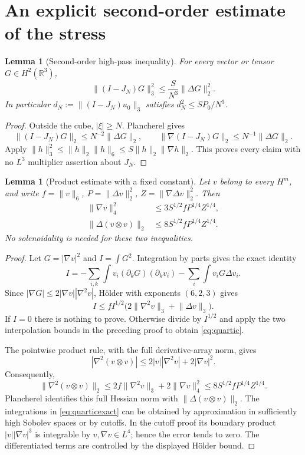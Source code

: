 \documentclass[11pt,a4paper]{article}
\newtheorem{lemma}[theorem]{Lemma}
\theoremstyle{definition}\newtheorem{definition}[theorem]{Definition}
\theoremstyle{remark}\newtheorem{remark}[theorem]{Remark}
\newcommand{\R}{\mathbb R}
\newcommand{\norm}[1]{\lVert #1\rVert}
\numberwithin{equation}{section}
\begin{document}
\section{An explicit second-order estimate of the stress}
\label{sec:stress}
\begin{lemma}[Second-order high-pass inequality]\label{lem:highpass2}
For every vector or tensor $G\in H^2(\R^3)$,
\begin{equation}\label{eq:highpass2}
 \norm{(I-J_N)G}_3^2\le\frac{S}{N^3}\norm{\Delta G}_2^2.
\end{equation}
In particular $d_N:=\norm{(I-J_N)u_0}_3$ satisfies $d_N^2\le SP_0/N^3$.
\end{lemma}
\begin{proof}
Outside the cube, $|\xi|\ge N$. Plancherel gives
\[
 \norm{(I-J_N)G}_2\le N^{-2}\norm{\Delta G}_2,
 \qquad \norm{\nabla(I-J_N)G}_2\le N^{-1}\norm{\Delta G}_2.
\]
Apply $\norm h_3^2\le\norm h_2\norm h_6\le S\norm h_2\norm{\nabla h}_2$. This proves every claim with no $L^3$ multiplier assertion about $J_N$.
\end{proof}

\begin{lemma}[Product estimate with a fixed constant]\label{lem:product2}
Let $v$ belong to every $H^m$, and write $f=\norm v_6$, $P=\norm{\Delta v}_2^2$, $Z=\norm{\nabla\Delta v}_2^2$. Then
\begin{align}
 \norm{\nabla v}_4^2&\le3S^{1/2}fP^{1/4}Z^{1/4},\label{eq:quartic}\\
 \norm{\Delta(v\otimes v)}_2&\le8S^{1/2}fP^{1/4}Z^{1/4}.\label{eq:product2}
\end{align}
No solenoidality is needed for these two inequalities.
\end{lemma}
\begin{proof}
Let $G=|\nabla v|^2$ and $I=\int G^2$. Integration by parts gives the exact identity
\begin{equation}\label{eq:quarticexact}
 I=-\sum_{i,k}\int v_i(\partial_kG)(\partial_kv_i)
   -\sum_i\int v_iG\Delta v_i.
\end{equation}
Since $|\nabla G|\le2|\nabla v||\nabla^2v|$, H\"older with exponents $(6,2,3)$ gives
\[
 I\le f I^{1/2}\bigl(2\norm{\nabla^2v}_3+\norm{\Delta v}_3\bigr).
\]
If $I=0$ there is nothing to prove. Otherwise divide by $I^{1/2}$ and apply the two interpolation bounds in the preceding proof to obtain \eqref{eq:quartic}.

The pointwise product rule, with the full derivative-array norm, gives
\[
 |\nabla^2(v\otimes v)|\le2|v||\nabla^2v|+2|\nabla v|^2.
\]
Consequently,
\[
 \norm{\nabla^2(v\otimes v)}_2
 \le2f\norm{\nabla^2v}_3+2\norm{\nabla v}_4^2
 \le8S^{1/2}fP^{1/4}Z^{1/4}.
\]
Plancherel identifies this full Hessian norm with $\norm{\Delta(v\otimes v)}_2$. The integrations in \eqref{eq:quarticexact} can be obtained by approximation in sufficiently high Sobolev spaces or by cutoffs. In the cutoff proof its boundary product $|v||\nabla v|^3$ is integrable by $v,\nabla v\in L^4$; hence the error tends to zero. The differentiated terms are controlled by the displayed H\"older bound.
\end{proof}
\end{document}
